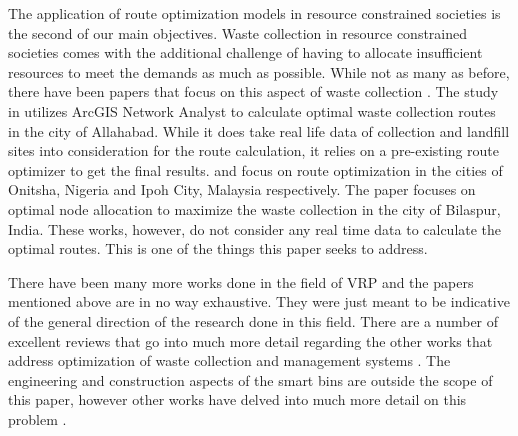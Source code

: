 \documentclass[12pt]{article}
\begin{document}
The application of route optimization models in resource constrained societies is the second of our main objectives. Waste collection in resource constrained societies comes with the additional challenge of having to allocate insufficient resources to meet the demands as much as possible. While not as many as before, there have been papers that focus on this aspect of waste collection \cite{chaudhary2019gis,rathore2020location,sk2020optimal,malakahmad2014solid, ogwueleke2009route}. The study in \cite{chaudhary2019gis} utilizes ArcGIS Network Analyst to calculate optimal waste collection routes in the city of Allahabad. While it does take real life data of collection and landfill sites into consideration for the route calculation, it relies on a pre-existing route optimizer to get the final results.\cite{ogwueleke2009route} and \cite{malakahmad2014solid} focus on route optimization in the cities of Onitsha, Nigeria and Ipoh City, Malaysia respectively. The paper \cite{rathore2020location} focuses on optimal node allocation to maximize the waste collection in the city of Bilaspur, India. These works, however, do not consider any real time data to calculate the optimal routes. This is one of the things this paper seeks to address.

There have been many more works done in the field of VRP and the papers mentioned above are in no way exhaustive. They were just meant to be indicative of the general direction of the research done in this field. There are a number of excellent reviews that go into much more detail regarding the other works that address optimization of waste collection and management systems \cite{belien2014municipal,sulemana2018optimal,abdallah2020artificial}. The engineering and construction aspects of the smart bins are outside the scope of this paper, however other works have delved into much more detail on this problem \cite{vishnu2021iot,lozano2018smart}.


\end{document}
